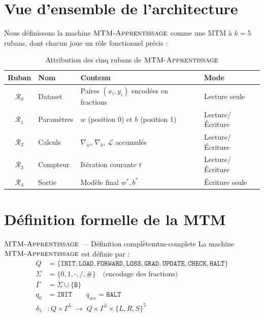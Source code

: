 \documentclass[12pt, a4paper, oneside]{report}
\newcommand{\B}{\texttt{B}}  %
\newcommand{\mtmlong}{\textsc{MTM-Apprentissage}}
\newcommand{\state}[1]{\texttt{#1}}
\newcommand{\tape}[1]{\mathcal{R}_{#1}}
\begin{document}
\section{Vue d'ensemble de l'architecture}

Nous définissons la machine $\mtmlong$ comme une MTM à $k = 5$ rubans, dont chacun joue un rôle fonctionnel précis :

\begin{table}[H]
  \centering
  \caption{Attribution des cinq rubans de $\mtmlong$}
  \label{tab:rubans}
  \renewcommand{\arraystretch}{1.4}
  \begin{tabularx}{\textwidth}{c l X l}
    \toprule
    \textbf{Ruban} & \textbf{Nom} & \textbf{Contenu} & \textbf{Mode} \\
    \midrule
    $\tape{0}$ & Dataset    & Paires $(x_i, y_i)$ encodées en fractions & Lecture seule \\
    $\tape{1}$ & Paramètres & $w$ (position 0) et $b$ (position 1)       & Lecture/Écriture \\
    $\tape{2}$ & Calculs    & $\nabla_w$, $\nabla_b$, $\mathcal{L}$ accumulés & Lecture/Écriture \\
    $\tape{3}$ & Compteur   & Itération courante $t$                      & Lecture/Écriture \\
    $\tape{4}$ & Sortie     & Modèle final $w^*, b^*$                    & Écriture seule \\
    \bottomrule
  \end{tabularx}
\end{table}

\section{Définition formelle de la MTM}

\begin{defn}{$\mtmlong$ --- Définition complète}{mtm-complete}
  La machine $\mtmlong$ est définie par :
  \begin{align*}
    Q      &= \{\state{INIT}, \state{LOAD}, \state{FORWARD}, \state{LOSS},
               \state{GRAD}, \state{UPDATE}, \state{CHECK}, \state{HALT}\} \\
    \Sigma &= \{0, 1, \texttt{-}, \texttt{/}, \texttt{\#}\} \quad \text{(encodage des fractions)} \\
    \Gamma &= \Sigma \cup \{\B\} \\
    q_0    &= \state{INIT} \qquad q_{\text{acc}} = \state{HALT} \\
    \delta_5 &: Q \times \Gamma^5 \;\longrightarrow\; Q \times \Gamma^5 \times \{L, R, S\}^5
  \end{align*}
\end{defn}
\end{document}
